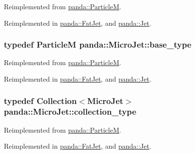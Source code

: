Reimplemented from \hyperlink{classpanda_1_1ParticleM_a1ba36e35f5cd6a26decfbaa815678d2a}{panda::ParticleM}.

Reimplemented in \hyperlink{classpanda_1_1FatJet_af8c5781a44a91eb012c01dde2a710039}{panda::FatJet}, and \hyperlink{classpanda_1_1Jet_a02ed819ca5ca46b0b3b212dbd56bce57}{panda::Jet}.\hypertarget{classpanda_1_1MicroJet_a2d604c4fa862edcde48e188002052ece}{
\subsubsection[{base\_\-type}]{\setlength{\rightskip}{0pt plus 5cm}typedef {\bf ParticleM} {\bf panda::MicroJet::base\_\-type}}}
\label{classpanda_1_1MicroJet_a2d604c4fa862edcde48e188002052ece}


Reimplemented from \hyperlink{classpanda_1_1ParticleM_a134d640b78531bc47ddb19ba490de07d}{panda::ParticleM}.

Reimplemented in \hyperlink{classpanda_1_1FatJet_ab06dcce3d9c117c93a036c87fb441795}{panda::FatJet}, and \hyperlink{classpanda_1_1Jet_a4fbfc283916dbd345b13a61396b878cf}{panda::Jet}.\hypertarget{classpanda_1_1MicroJet_a07385bfbc6560036a2f568b073183df9}{
\subsubsection[{collection\_\-type}]{\setlength{\rightskip}{0pt plus 5cm}typedef {\bf Collection}$<${\bf MicroJet}$>$ {\bf panda::MicroJet::collection\_\-type}}}
\label{classpanda_1_1MicroJet_a07385bfbc6560036a2f568b073183df9}


Reimplemented from \hyperlink{classpanda_1_1ParticleM_ae39fbe234c21960d067e8790541d0d68}{panda::ParticleM}.

Reimplemented in \hyperlink{classpanda_1_1FatJet_a2740a440685d1d581f92bcedbf1a6f9e}{panda::FatJet}, and \hyperlink{classpanda_1_1Jet_abc4f1b55581c1f9a65d14ca360458c40}{panda::Jet}.

